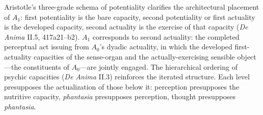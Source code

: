 \documentclass{article}
\begin{document}
Aristotle's three-grade schema of potentiality clarifies the architectural placement of $A_1$: first potentiality is the bare capacity, second potentiality or first actuality is the developed capacity, second actuality is the exercise of that capacity (\textit{De Anima} II.5, 417a21--b2). $A_1$ corresponds to second actuality: the completed perceptual act issuing from $A_0$'s dyadic actuality, in which the developed first-actuality capacities of the sense-organ and the actually-exercising sensible object---the constituents of $A_0$---are jointly engaged. The hierarchical ordering of psychic capacities (\textit{De Anima} II.3) reinforces the iterated structure. Each level presupposes the actualization of those below it: perception presupposes the nutritive capacity, \textit{phantasia} presupposes perception, thought presupposes \textit{phantasia}.
\end{document}
